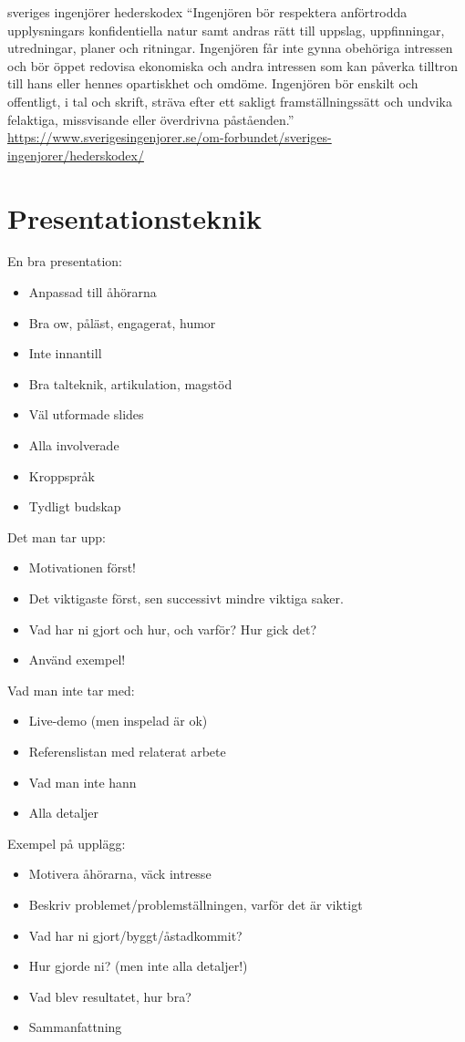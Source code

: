 sveriges ingenjörer hederskodex
``Ingenjören bör respektera anförtrodda upplysningars konfidentiella natur
samt andras rätt till uppslag, uppfinningar, utredningar, planer och ritningar.
Ingenjören får inte gynna obehöriga intressen och bör öppet redovisa
ekonomiska och andra intressen som kan påverka tilltron till hans eller hennes
opartiskhet och omdöme.
Ingenjören bör enskilt och offentligt, i tal och skrift, sträva efter ett sakligt
framställningssätt och undvika felaktiga, missvisande eller överdrivna påståenden.''
\url{https://www.sverigesingenjorer.se/om-forbundet/sveriges-ingenjorer/hederskodex/}


\section{Presentationsteknik}
En bra presentation:
\begin{itemize}
\item Anpassad till åhörarna
\item Bra ow, påläst, engagerat, humor
\item Inte innantill
\item Bra talteknik, artikulation, magstöd
\item Väl utformade slides
\item Alla involverade
\item Kroppspråk
\item Tydligt budskap
\end{itemize}

Det man tar upp:
\begin{itemize}
\item Motivationen först!
\item Det viktigaste först, sen successivt mindre viktiga saker.
\item Vad har ni gjort och hur, och varför? Hur gick det?
\item Använd exempel!
\end{itemize}

Vad man inte tar med:
\begin{itemize}
\item Live-demo (men inspelad är ok)
\item Referenslistan med relaterat arbete
\item Vad man inte hann
\item Alla detaljer
\end{itemize}

Exempel på upplägg:
\begin{itemize}
\item Motivera åhörarna, väck intresse
\item Beskriv problemet/problemställningen, varför det är viktigt
\item Vad har ni gjort/byggt/åstadkommit?
\item Hur gjorde ni? (men inte alla detaljer!)
\item Vad blev resultatet, hur bra?
\item Sammanfattning
\end{itemize}

